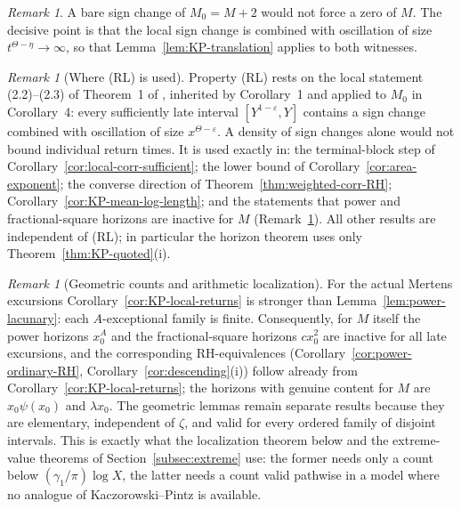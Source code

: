 \documentclass[11pt]{amsart}
\numberwithin{equation}{section}
\theoremstyle{plain}
\theoremstyle{definition}
\theoremstyle{remark}
\newtheorem{remark}[theorem]{Remark}
\begin{document}
\begin{remark}
A bare sign change of $M_0=M+2$ would not force a zero of $M$. The
decisive point is that the local sign change is combined with oscillation of
size $t^{\Theta-\eta}\to\infty$, so that Lemma~\ref{lem:KP-translation}
applies to both witnesses.
\end{remark}

\begin{remark}[Where (RL) is used]
\label{rem:RL-dependence}
Property (RL) rests on the local statement (2.2)--(2.3) of
Theorem~1 of \cite{KP86}, inherited by Corollary~1 and applied to $M_0$ in
Corollary~4: every sufficiently late interval $[Y^{1-\varepsilon},Y]$
contains a sign change combined with oscillation of size
$x^{\Theta-\varepsilon}$.  A density of sign changes alone would not bound
individual return times. It is used exactly in:
the terminal-block step of Corollary~\ref{cor:local-corr-sufficient}; the
lower bound of Corollary~\ref{cor:area-exponent}; the converse direction of
Theorem~\ref{thm:weighted-corr-RH}; Corollary~\ref{cor:KP-mean-log-length};
and the statements that power and fractional-square horizons are inactive
for $M$ (Remark~\ref{rem:geom-vs-arith}). All other results are independent
of (RL); in particular the horizon theorem uses only
Theorem~\ref{thm:KP-quoted}(i).
\end{remark}

\begin{remark}[Geometric counts and arithmetic localization]
\label{rem:geom-vs-arith}
For the actual Mertens excursions Corollary~\ref{cor:KP-local-returns} is
stronger than Lemma~\ref{lem:power-lacunary}: each $A$-exceptional family is
finite. Consequently, for $M$ itself the power horizons $x_0^A$ and the
fractional-square horizons $cx_0^2$ are inactive for all late excursions,
and the corresponding RH-equivalences (Corollary~\ref{cor:power-ordinary-RH},
Corollary~\ref{cor:descending}(i)) follow already from
Corollary~\ref{cor:KP-local-returns}; the horizons with genuine content for
$M$ are $x_0\psi(x_0)$ and $\lambda x_0$. The geometric lemmas remain separate results because they are
elementary, independent of $\zeta$, and valid for every ordered family of
disjoint intervals. This is exactly what the localization theorem below and
the extreme-value theorems of Section~\ref{subsec:extreme} use: the former
needs only a count below $(\gamma_1/\pi)\log X$, the latter needs a count
valid pathwise in a model where no analogue of Kaczorowski--Pintz is
available.
\end{remark}
\end{document}
